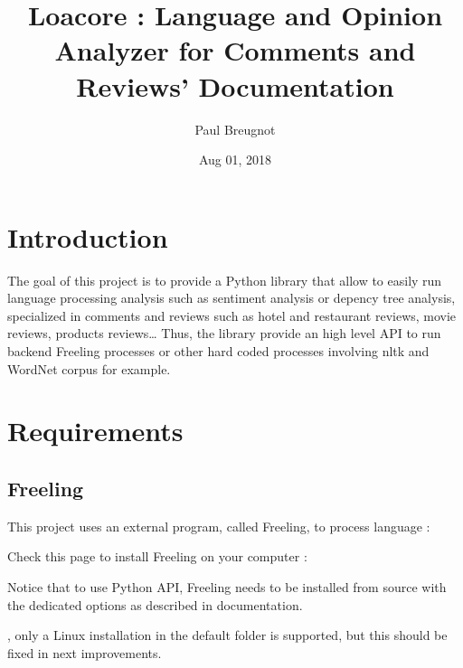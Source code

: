 \documentclass[letterpaper,10pt,english]{sphinxmanual}
\title{Loacore : Language and Opinion Analyzer for Comments and Reviews' Documentation}
\date{Aug 01, 2018}
\author{Paul Breugnot}
\begin{document}
\maketitle
\sphinxtableofcontents
{}\label{\detokenize{index::doc}}



\chapter{Introduction}
\label{\detokenize{introduction:introduction}}\label{\detokenize{introduction::doc}}

The goal of this project is to provide a Python library that allow to easily run language processing analysis such as sentiment analysis or depency tree analysis, specialized in comments and reviews such as hotel and restaurant reviews, movie reviews, products reviews… Thus, the library provide an high level API to run backend Freeling processes or other hard coded processes involving nltk and WordNet corpus for example.



\chapter{Requirements}
\label{\detokenize{requirements:requirements}}\label{\detokenize{requirements::doc}}

\section{Freeling}
\label{\detokenize{requirements:freeling}}
\begin{DUlineblock}{0em}
\item[] This project uses an external program, called Freeling, to process language : 
\item[] Check this page to install Freeling on your computer : 
\item[] Notice that to use Python API, Freeling needs to be installed from source with the dedicated options as described in documentation.
\item[] , only a Linux installation in the default folder  is supported, but this should be fixed in next improvements.
\end{DUlineblock}
\end{document}
